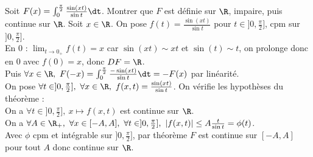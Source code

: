 \documentclass[11pt]{article}
\begin{document}
\begin{ex}{}{}
    Soit $F(x)=\int_0^{\frac{\pi}{2}}\frac{\sin(xt)}{\sin t}\dt$. Montrer que $F$ est définie sur $\R$, impaire, puis continue sur $\R$.
    \tcblower
    Soit $x\in\R$. On pose $f(t)=\frac{\sin(xt)}{\sin t}$ pour $t\in]0,\frac{\pi}{2}]$, cpm sur $]0,\frac{\pi}{2}]$.\\
    En 0 : $\lim_{t\to0_+} f(t)=x$ car $\sin(xt)\sim xt$ et $\sin(t)\sim t$, on prolonge donc en 0 avec $f(0)=x$, donc $DF=\R$.\\
    Puis $\forall x \in \R, ~ F(-x)=\int_0^{\frac{\pi}{2}}\frac{-\sin(xt)}{\sin t}\dt = -F(x)$ par linéarité.\\
    On pose $\forall t \in ]0,\frac{\pi}{2}], ~ \forall x \in \R, ~ f(x,t)=\frac{\sin(xt)}{\sin t}$. On vérifie les hypothèses du théorème :\\
    On a $\forall t \in ]0,\frac{\pi}{2}], ~ x\mapsto f(x,t)$ est continue sur $\R$.\\
    On a $\forall A \in \R_+, ~ \forall x \in [-A,A], ~ \forall t \in ]0,\frac{\pi}{2}], ~ |f(x,t)|\leq A\frac{t}{\sin t}=\phi(t)$.\\
    Avec $\phi$ cpm et intégrable sur $]0,\frac{\pi}{2}]$, par théorème $F$ est continue sur $[-A,A]$ pour tout $A$ donc continue sur $\R$.
\end{ex}
\end{document}
